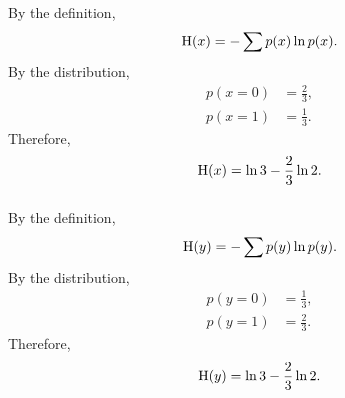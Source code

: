 \subsubsection{}
By the definition,
%
\begin{equation}
{\rm H}(x) = - \sum p(x) \ln p(x).
\end{equation}
%
By the distribution,
%
\begin{equation}
\begin{aligned}
p(x = 0) &= \frac{2}{3}, \\
p(x = 1) &= \frac{1}{3}.
\end{aligned}
\end{equation}
%
Therefore,
%
\begin{equation}
{\rm H}(x) = \ln 3 - \frac{2}{3} \ln 2.
\end{equation}
%


\subsubsection{}
By the definition,
%
\begin{equation}
{\rm H}(y) = - \sum p(y) \ln p(y).
\end{equation}
%
By the distribution,
%
\begin{equation}
\begin{aligned}
p(y = 0) &= \frac{1}{3}, \\
p(y = 1) &= \frac{2}{3}.
\end{aligned}
\end{equation}
%
Therefore,
%
\begin{equation}
{\rm H}(y) = \ln 3 - \frac{2}{3} \ln 2.
\end{equation}
%



